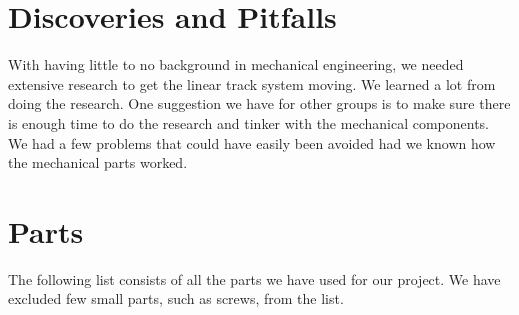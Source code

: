 \documentclass[11pt]{IEEEtran}
\begin{document}
\newpage

\appendices

\section{Discoveries and Pitfalls}
With having little to no background in mechanical engineering, we needed extensive research to get the linear track system moving. We learned a lot from doing the research. One suggestion we have for other groups is to make sure there is enough time to do the research and tinker with the mechanical components. We had a few problems that could have easily been avoided had we known how the mechanical parts worked.

\section{Parts}
The following list consists of all the parts we have used for our project. We have excluded few small parts, such as screws, from the list. 
\end{document}
